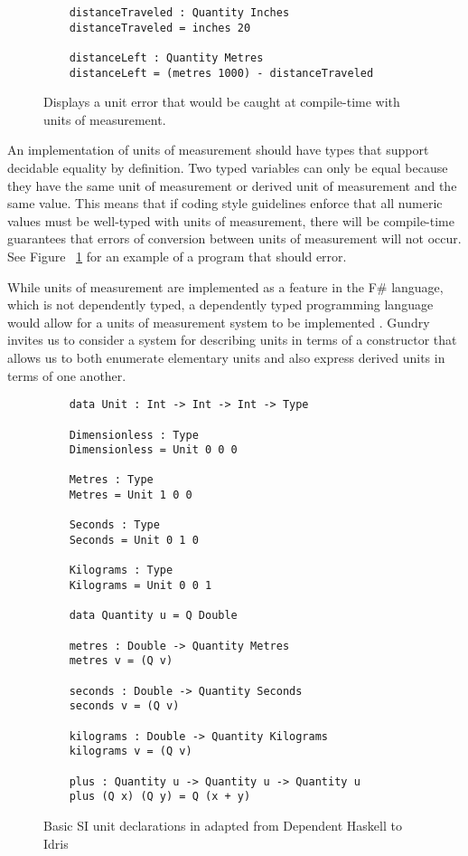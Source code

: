 \begin{figure}
  \caption{Displays a unit error that would be caught at compile-time with units of measurement.}
  \label{unit_error}
  \begin{lstlisting}
    distanceTraveled : Quantity Inches
    distanceTraveled = inches 20

    distanceLeft : Quantity Metres
    distanceLeft = (metres 1000) - distanceTraveled
  \end{lstlisting}
\end{figure}

An implementation of units of measurement should have types that support
decidable equality by definition. Two typed variables can only be equal because
they have the same unit of measurement or derived unit of measurement and the
same value. This means that if coding style guidelines enforce that all numeric
values must be well-typed with units of measurement, there will be compile-time
guarantees that errors of conversion between units of measurement will not
occur. See Figure ~\ref{unit_error} for an example of a program that should
error. 

While units of measurement are implemented as a feature in the F\# language,
which is not dependently typed, a dependently typed programming language would
allow for a units of measurement system to be implemented \cite{gundry2013}.
Gundry invites us to consider a system for describing units in terms of a
constructor that allows us to both enumerate elementary units and also express
derived units in terms of one another. 

\begin{figure}[h]
  \label{idris_code}
  \caption{Basic SI unit declarations in adapted from Dependent Haskell to Idris \cite{gundry2013}}
  \begin{lstlisting}
    data Unit : Int -> Int -> Int -> Type
    
    Dimensionless : Type
    Dimensionless = Unit 0 0 0
    
    Metres : Type
    Metres = Unit 1 0 0
    
    Seconds : Type
    Seconds = Unit 0 1 0
    
    Kilograms : Type
    Kilograms = Unit 0 0 1
    
    data Quantity u = Q Double
    
    metres : Double -> Quantity Metres
    metres v = (Q v)
    
    seconds : Double -> Quantity Seconds
    seconds v = (Q v)
    
    kilograms : Double -> Quantity Kilograms
    kilograms v = (Q v)
    
    plus : Quantity u -> Quantity u -> Quantity u
    plus (Q x) (Q y) = Q (x + y)
  \end{lstlisting}
\end{figure}

